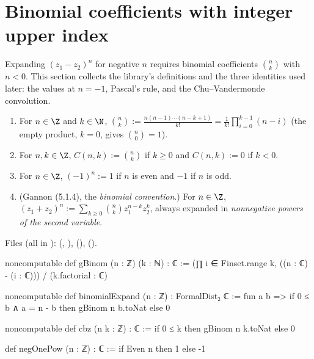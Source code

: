 \section{Binomial coefficients with integer upper index}\label{l01:sec:binomial}

Expanding $(z_1-z_2)^n$ for negative $n$ requires binomial coefficients $\binom nk$ with $n<0$.
This section collects the library's definitions and the three identities used later: the values at
$n = -1$, Pascal's rule, and the Chu--Vandermonde convolution.

\begin{definition}\label{l01:def:gbinom}
\leavevmode
\begin{enumerate}[label=(\roman*)]
\item For $n\in\Z$ and $k\in\N$,
  $\displaystyle\binom nk := \frac{n(n-1)\cdots(n-k+1)}{k!} = \frac1{k!}\prod_{i=0}^{k-1}(n-i)$
  (the empty product, $k = 0$, gives $\binom n0 = 1$).
\item For $n,k\in\Z$, $C(n,k) := \binom nk$ if $k\ge0$ and $C(n,k) := 0$ if $k<0$.
\item For $n\in\Z$, $(-1)^n := 1$ if $n$ is even and $-1$ if $n$ is odd.
\item (Gannon (5.1.4), the \emph{binomial convention}.) For $n\in\Z$,
  $\displaystyle(z_1+z_2)^n := \sum_{k\ge0}\binom nk z_1^{n-k}z_2^{k}$, always expanded in
  \emph{nonnegative powers of the second variable}.
\end{enumerate}
\end{definition}

\noindent Files (all in ): 
(, ),  (), 
().
\begin{leancode}
noncomputable def gBinom (n : ℤ) (k : ℕ) : ℂ :=
  (∏ i ∈ Finset.range k, ((n : ℂ) - (i : ℂ))) / (k.factorial : ℂ)

noncomputable def binomialExpand (n : ℤ) : FormalDist₂ ℂ :=
  fun a b => if 0 ≤ b ∧ a = n - b then gBinom n b.toNat else 0

noncomputable def cbz (n k : ℤ) : ℂ := if 0 ≤ k then gBinom n k.toNat else 0

def negOnePow (n : ℤ) : ℂ := if Even n then 1 else -1
\end{leancode}

